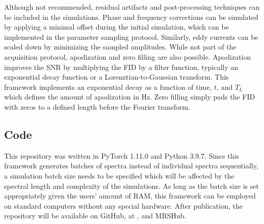 Although not recommended, residual artifacts and post-processing techniques can be included in the simulations. Phase and frequency corrections can be simulated by applying a minimal offset during the initial simulation, which can be implemented in the parameter sampling protocol. Similarly, eddy currents can be scaled down by minimizing the sampled amplitudes. While not part of the acquisition protocol, apodization and zero filling are also possible. Apodization improves the SNR by multiplying the FID by a filter function, typically an exponential decay function or a Lorenztian-to-Gaussian transform. This framework implements an exponential decay as a function of time, $t$, and $T_L$ which defines the amount of apodization in Hz. Zero filling simply pads the FID with zeros to a defined length before the Fourier transform.

\subsection{Code}
This repository was written in PyTorch 1.11.0 and Python 3.9.7. Since this framework generates batches of spectra instead of individual spectra sequentially, a simulation batch size needs to be specified which will be affected by the spectral length and complexity of the simulations. As long as the batch size is set appropriately given the users' amount of RAM, this framework can be employed on standard computers without any special hardware. After publication, the repository will be available on GitHub, at , and MRSHub.

